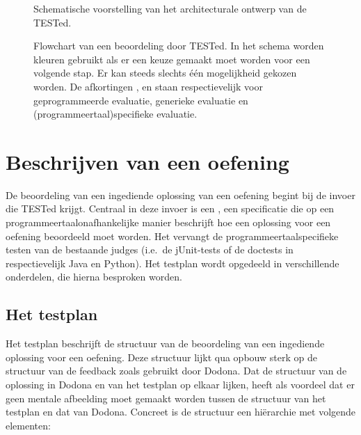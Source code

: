\begin{figure}
    \centering
    
    \caption{Schematische voorstelling van het architecturale ontwerp van de TESTed.}
    \label{fig:universal-judge}
\end{figure}

\begin{figure}
    \centering
    
    \caption{
        Flowchart van een beoordeling door TESTed.
        In het schema worden kleuren gebruikt als er een keuze gemaakt moet worden voor een volgende stap.
        Er kan steeds slechts één mogelijkheid gekozen worden.
        De afkortingen ,  en  staan respectievelijk voor geprogrammeerde evaluatie, generieke evaluatie en (programmeertaal)specifieke evaluatie.
    }
    \label{fig:tested-flow}
\end{figure}


\section{Beschrijven van een oefening}\label{sec:testplan}

De beoordeling van een ingediende oplossing van een oefening begint bij de invoer die TESTed krijgt.
Centraal in deze invoer is een , een specificatie die op een programmeertaalonafhankelijke manier beschrijft hoe een oplossing voor een oefening beoordeeld moet worden.
Het vervangt de programmeertaalspecifieke testen van de bestaande judges (i.e.\ de jUnit-tests of de doctests in respectievelijk Java en Python).
Het testplan  wordt opgedeeld in verschillende onderdelen, die hierna besproken worden.

\subsection{Het testplan}\label{subsec:het-testplan}

Het testplan  beschrijft de structuur van de beoordeling van een ingediende oplossing voor een oefening.
Deze structuur lijkt qua opbouw sterk op de structuur van de feedback zoals gebruikt door Dodona.
Dat de structuur van de oplossing in Dodona en van het testplan op elkaar lijken, heeft als voordeel dat er geen mentale afbeelding moet gemaakt worden tussen de structuur van het testplan en dat van Dodona.
Concreet is de structuur een hiërarchie met volgende elementen:

